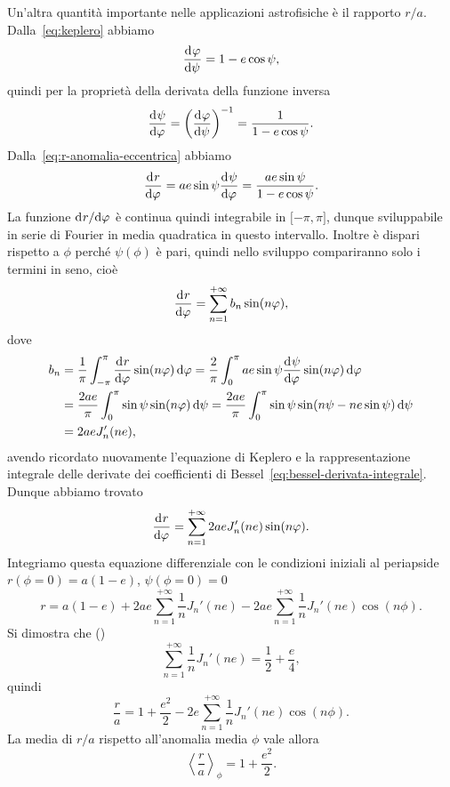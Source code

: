 Un'altra quantità importante nelle applicazioni astrofisiche è il rapporto
$r/a$. Dalla~\eqref{eq:keplero} abbiamo
\begin{equation}
  \frac{{\mathop{}\!\mathrm{d}^{}}\varphi}{\mathop{}\!\mathrm{d} {\psi}^{}} = 1 -e\cos\psi,
\end{equation}
quindi per la proprietà della derivata della funzione inversa
\begin{equation}
  \frac{{\mathop{}\!\mathrm{d}^{}}\psi}{\mathop{}\!\mathrm{d} {\varphi}^{}} =
  \left(
    \frac{{\mathop{}\!\mathrm{d}^{}}\varphi}{\mathop{}\!\mathrm{d} {\psi}^{}}
  \right)^{-1} = \frac{1}{1 - e\cos\psi}.
\end{equation}
Dalla~\eqref{eq:r-anomalia-eccentrica} abbiamo
\begin{equation}
  \frac{{\mathop{}\!\mathrm{d}^{}}r}{\mathop{}\!\mathrm{d} {\varphi}^{}} = ae\sin\psi\frac{{\mathop{}\!\mathrm{d}^{}}\psi}{\mathop{}\!\mathrm{d} {\varphi}^{}} = \frac{ae\sin\psi}{1-e\cos\psi}.
\end{equation}
La funzione $\mathrm{d}^{}r / \mathrm{d} {\varphi}^{}$ è continua quindi integrabile in $\mathopen{[}-\pi,
\pi\mathclose{]}$, dunque sviluppabile in serie di Fourier in media quadratica
in questo intervallo. Inoltre è dispari rispetto a $\phi$ perché $\psi(\phi)$ è
pari, quindi nello sviluppo compariranno solo i termini in seno, cioè
\begin{equation}
  \frac{{\mathop{}\!\mathrm{d}^{}}r}{\mathop{}\!\mathrm{d} {\varphi}^{}} = \sum_{n=1}^{+\infty}b_n\sin(n\varphi),
\end{equation}
dove
\begin{equation}
  \begin{split}
    b_n &= \frac{1}{\pi}\int_{-\pi}^\pi \toder{r}{\phi}\sin(n\phi)\dd\phi =
    \frac{2}{\pi}\int_0^\pi ae\sin\psi\toder{\psi}{\phi}\sin(n\phi)\dd\phi \\
    &= \frac{2ae}{\pi}\int_0^\pi \sin\psi\sin(n\phi)\dd\psi = \frac{2ae}{\pi}
    \int_0^\pi \sin\psi\sin(n\psi - ne\sin\psi)\dd\psi \\
    &= 2aeJ_n'(ne),
  \end{split}
\end{equation}
avendo ricordato nuovamente l'equazione di Keplero e la rappresentazione
integrale delle derivate dei coefficienti di
Bessel~\eqref{eq:bessel-derivata-integrale}. Dunque abbiamo trovato
\begin{equation}
  \frac{{\mathop{}\!\mathrm{d}^{}}r}{\mathop{}\!\mathrm{d} {\varphi}^{}} = \sum_{n=1}^{+\infty} 2aeJ_n'(ne)\sin(n\varphi).
\end{equation}
Integriamo questa equazione differenziale con le condizioni iniziali al
periapside $r(\phi=0) = a(1-e)$, $\psi(\phi=0)=0$
\begin{equation}
  r = a(1-e) + 2ae\sum_{n=1}^{+\infty}\frac{1}{n}J_n'(ne) -
  2ae\sum_{n=1}^{+\infty}\frac{1}{n}J_n'(ne)\cos(n\phi).
\end{equation}
Si dimostra che (\textcite[555]{watson:bessel})
\begin{equation}
  \sum_{n=1}^{+\infty}\frac{1}{n}J_n'(ne) = \frac{1}{2} + \frac{e}{4},
\end{equation}
quindi
\begin{equation}
  \label{eq:r-su-a-bessel}
  \frac{r}{a} = 1 + \frac{e^2}{2} - 2e \sum_{n=1}^{+\infty} \frac{1}{n} J_n'(ne)
  \cos(n\phi).
\end{equation}
La media di $r/a$ rispetto all'anomalia media $\phi$ vale allora
\begin{equation}
  \left\langle \frac{r}{a} \right\rangle_\phi = 1 + \frac{e^2}{2}.
\end{equation}

